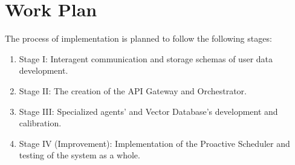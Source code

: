 \section{Work Plan}
The process of implementation is planned to follow the following stages:

\begin{enumerate}
	\item Stage I: Interagent communication and storage schemas of user data development.
	\item Stage II: The creation of the API Gateway and Orchestrator.
	\item Stage III: Specialized agents' and Vector Database's development and calibration.
	\item Stage IV (Improvement): Implementation of the Proactive Scheduler and testing of the system as a whole.
\end{enumerate}